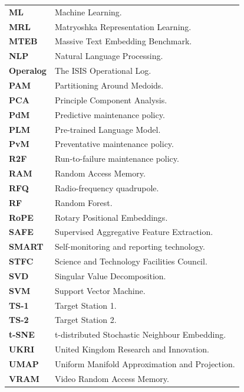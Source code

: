 \documentclass[10pt,oneside]{report}
\begin{document}
\begin{table}[ht]
\begin{tabular}{ll}
        \textbf{ML} & Machine Learning. \\
        \textbf{MRL} & Matryoshka Representation Learning. \\
        \textbf{MTEB} & Massive Text Embedding Benchmark. \\
        \textbf{NLP} & Natural Language Processing. \\
        \textbf{Operalog} & The ISIS Operational Log. \\
        \textbf{PAM} & Partitioning Around Medoids. \\
        \textbf{PCA} & Principle Component Analysis. \\
        \textbf{PdM} & Predictive maintenance policy. \\
        \textbf{PLM} & Pre-trained Language Model. \\
        \textbf{PvM} & Preventative maintenance policy. \\
        \textbf{R2F} & Run-to-failure maintenance policy. \\
        \textbf{RAM} & Random Access Memory. \\
        \textbf{RFQ} & Radio-frequency quadrupole. \\
        \textbf{RF} & Random Forest. \\
        \textbf{RoPE} & Rotary Positional Embeddings. \\
        \textbf{SAFE} & Supervised Aggregative Feature Extraction. \\
        \textbf{SMART} & Self-monitoring and reporting technology. \\
        \textbf{STFC} & Science and Technology Facilities Council. \\
        \textbf{SVD} & Singular Value Decomposition. \\
        \textbf{SVM} & Support Vector Machine. \\
        \textbf{TS-1} & Target Station 1. \\
        \textbf{TS-2} & Target Station 2. \\
        \textbf{t-SNE} & t-distributed Stochastic Neighbour Embedding. \\
        \textbf{UKRI} & United Kingdom Research and Innovation. \\
        \textbf{UMAP} & Uniform Manifold Approximation and Projection. \\
        \textbf{VRAM} & Video Random Access Memory. \\

    \end{tabular}
\end{table}
\end{document}
